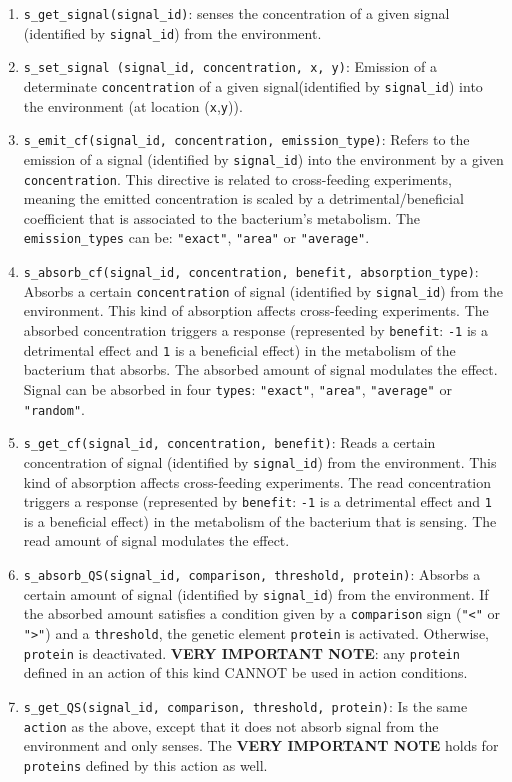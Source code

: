 \documentclass[10pt,a4paper]{article}
\begin{document}
\begin{enumerate}
	\item \texttt{s\_get\_signal(signal\_id)}: senses the concentration of a given signal (identified by \texttt{signal\_id}) from the environment.
	\item \texttt{s\_set\_signal (signal\_id, concentration, x, y)}: Emission of a determinate \texttt{concentration} of a given signal(identified by \texttt{signal\_id}) into the environment (at location (\texttt{x},\texttt{y})).
	\item \texttt{s\_emit\_cf(signal\_id, concentration, emission\_type)}: Refers to the emission of a signal (identified by \texttt{signal\_id}) into the environment by a given \texttt{concentration}. This directive is related to cross-feeding experiments, meaning the emitted concentration is scaled by a detrimental/beneficial coefficient that is associated to the bacterium’s metabolism. The \texttt{emission\_types} can be: \texttt{"{}exact"{}}, \texttt{"{}area"{}} or \texttt{"{}average"{}}.
	\item \texttt{s\_absorb\_cf(signal\_id, concentration, benefit, absorption\_type)}: Absorbs a certain \texttt{concentration} of signal (identified by \texttt{signal\_id}) from the environment. This kind of absorption affects cross-feeding experiments. The absorbed concentration triggers a response (represented by \texttt{benefit}: \texttt{-1} is a detrimental effect and \texttt{1} is a beneficial effect) in the metabolism of the bacterium that absorbs. The
absorbed amount of signal modulates the effect. Signal can be absorbed in four \texttt{types}:
\texttt{"{}exact"{}}, \texttt{"{}area"{}}, \texttt{"{}average"{}} or \texttt{"{}random"{}}.
	\item \texttt{s\_get\_cf(signal\_id, concentration, benefit)}: Reads a certain concentration of signal (identified by \texttt{signal\_id}) from the environment. This kind of absorption affects cross-feeding experiments. The read concentration triggers a response (represented by  \texttt{benefit}: \texttt{-1} is a detrimental effect and \texttt{1} is a beneficial effect) in the metabolism of the bacterium that is sensing. The read amount of signal modulates the effect.
	\item \texttt{s\_absorb\_QS(signal\_id, comparison, threshold, protein)}: Absorbs a certain amount of signal (identified by \texttt{signal\_id}) from the environment. If the absorbed amount satisfies a condition given by a \texttt{comparison} sign (\texttt{"{}<"{}} or \texttt{"{}>"{}}) and a \texttt{threshold}, the genetic element \texttt{protein} is activated. Otherwise, \texttt{protein} is deactivated. \textbf{VERY IMPORTANT NOTE}: any \texttt{protein} defined in an action of this kind CANNOT be used in action conditions.
	\item \texttt{s\_get\_QS(signal\_id, comparison, threshold, protein)}: Is the same \texttt{action} as the above, except that it does not absorb signal from the environment and only senses. The \textbf{VERY IMPORTANT NOTE} holds for \texttt{proteins} defined by this action as well.
\end{enumerate}
\end{document}
